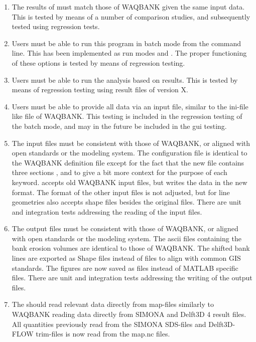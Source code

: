 \begin{enumerate}
\item The results of \dfastbe must match those of WAQBANK given the same input data.
This is tested by means of a number of comparison studies, and subsequently tested using regression tests.

\item Users must be able to run this program in batch mode from the command line.
This has been implemented as run modes  and .
The proper functioning of these options is tested by means of regression testing.

\item Users must be able to run the analysis based on \dflowfm results.
This is tested by means of regression testing using result files of \dflowfm version X.

\item Users must be able to provide all data via an input file, similar to the ini-file like file of WAQBANK.
This testing is included in the regression testing of the batch mode, and may in the future be included in the gui testing.

\item The input files must be consistent with those of WAQBANK, or aligned with open standards or the \dflowfm modeling system.
The \dfastbe configuration file is identical to the WAQBANK definition file except for the fact that the new file contains three sections \keyw{[General]}, \keyw{[Detect]} and \keyw{[Erosion]} to give a bit more context for the purpose of each keyword.
\dfastbe accepts old WAQBANK input files, but writes the data in the new format.
The format of the other input files is not adjusted, but for line geometries \dfastbe also accepts shape files besides the original  files.
There are unit and integration tests addressing the reading of the input files.

\item The output files must be consistent with those of WAQBANK, or aligned with open standards or the \dflowfm modeling system.
The ascii files containing the bank erosion volumes are identical to those of WAQBANK.
The shifted bank lines are exported as Shape files instead of  files to align with common GIS standards.
The figures are now saved as  files instead of MATLAB specific  files.
There are unit and integration tests addressing the writing of the output files.

\item The should read relevant data directly from \dflowfm map-files similarly to WAQBANK reading data directly from SIMONA and Delft3D 4 result files.
All quantities previously read from the SIMONA SDS-files and Delft3D-FLOW trim-files is now read from the \dflowfm map.nc files.


\end{enumerate}
